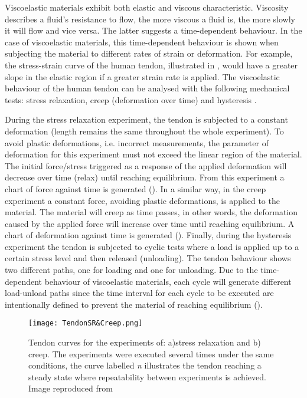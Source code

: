 Viscoelastic materials exhibit both elastic and viscous characteristic. Viscosity describes a fluid's resistance to flow, the more viscous a fluid is, the more slowly it will flow and vice versa. The latter suggests a time-dependent behaviour. In the case of viscoelastic materials, this time-dependent behaviour is shown when subjecting the material to different rates of strain or deformation. For example, the stress-strain curve of the human tendon, illustrated in , would have a greater slope in the elastic region if a greater strain rate is applied. The viscoelastic behaviour of the human tendon can be analysed with the following mechanical tests: stress relaxation, creep (deformation over time) and hysteresis \cite{nordin2001basic}.

During the stress relaxation experiment, the tendon is subjected to a constant deformation (length remains the same throughout the whole experiment). To avoid plastic deformations, i.e. incorrect measurements, the parameter of deformation for this experiment must not exceed the linear region of the material. The initial force/stress triggered as a response of the applied deformation will decrease over time (relax) until reaching equilibrium. From this experiment a chart of force against time is generated (). In a similar way, in the creep experiment a constant force, avoiding plastic deformations, is applied to the material. The material will creep as time passes, in other words, the deformation caused by the applied force will increase over time until reaching equilibrium. A chart of deformation against time is generated (). Finally, during the hysteresis experiment the tendon is subjected to cyclic tests where a load is applied up to a certain stress level and then released (unloading). The tendon behaviour shows two different paths, one for loading and one for unloading. Due to the time-dependent behaviour of viscoelastic materials, each cycle will generate different load-unload paths since the time interval for each cycle to be executed are intentionally defined to prevent the material of reaching equilibrium ().

\begin{figure}[htb!]
    \centering
    \texttt{[image: TendonSR\&Creep.png]}
    \caption{Tendon curves for the experiments of: a)stress relaxation and b) creep. The experiments were executed several times under the same conditions, the curve labelled \textit{n} illustrates the tendon reaching a steady state where repeatability between experiments is achieved. Image reproduced from \cite{maurel1998biomechanical} }
    \label{fig:tendonSR_Creep}
\end{figure}

